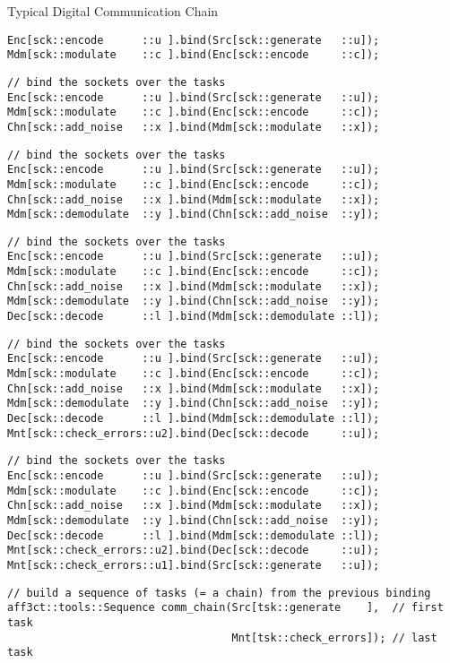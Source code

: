 \begin{frame}{Typical Digital Communication Chain}
\begin{overprint}
\begin{verbatim}
Enc[sck::encode      ::u ].bind(Src[sck::generate   ::u]);
Mdm[sck::modulate    ::c ].bind(Enc[sck::encode     ::c]);
  \end{verbatim}
  \begin{verbatim}
// bind the sockets over the tasks
Enc[sck::encode      ::u ].bind(Src[sck::generate   ::u]);
Mdm[sck::modulate    ::c ].bind(Enc[sck::encode     ::c]);
Chn[sck::add_noise   ::x ].bind(Mdm[sck::modulate   ::x]);
  \end{verbatim}
  \begin{verbatim}
// bind the sockets over the tasks
Enc[sck::encode      ::u ].bind(Src[sck::generate   ::u]);
Mdm[sck::modulate    ::c ].bind(Enc[sck::encode     ::c]);
Chn[sck::add_noise   ::x ].bind(Mdm[sck::modulate   ::x]);
Mdm[sck::demodulate  ::y ].bind(Chn[sck::add_noise  ::y]);
  \end{verbatim}
  \begin{verbatim}
// bind the sockets over the tasks
Enc[sck::encode      ::u ].bind(Src[sck::generate   ::u]);
Mdm[sck::modulate    ::c ].bind(Enc[sck::encode     ::c]);
Chn[sck::add_noise   ::x ].bind(Mdm[sck::modulate   ::x]);
Mdm[sck::demodulate  ::y ].bind(Chn[sck::add_noise  ::y]);
Dec[sck::decode      ::l ].bind(Mdm[sck::demodulate ::l]);
  \end{verbatim}
  \begin{verbatim}
// bind the sockets over the tasks
Enc[sck::encode      ::u ].bind(Src[sck::generate   ::u]);
Mdm[sck::modulate    ::c ].bind(Enc[sck::encode     ::c]);
Chn[sck::add_noise   ::x ].bind(Mdm[sck::modulate   ::x]);
Mdm[sck::demodulate  ::y ].bind(Chn[sck::add_noise  ::y]);
Dec[sck::decode      ::l ].bind(Mdm[sck::demodulate ::l]);
Mnt[sck::check_errors::u2].bind(Dec[sck::decode     ::u]);
  \end{verbatim}
  \begin{verbatim}
// bind the sockets over the tasks
Enc[sck::encode      ::u ].bind(Src[sck::generate   ::u]);
Mdm[sck::modulate    ::c ].bind(Enc[sck::encode     ::c]);
Chn[sck::add_noise   ::x ].bind(Mdm[sck::modulate   ::x]);
Mdm[sck::demodulate  ::y ].bind(Chn[sck::add_noise  ::y]);
Dec[sck::decode      ::l ].bind(Mdm[sck::demodulate ::l]);
Mnt[sck::check_errors::u2].bind(Dec[sck::decode     ::u]);
Mnt[sck::check_errors::u1].bind(Src[sck::generate   ::u]);
  \end{verbatim}
  \begin{verbatim}
// build a sequence of tasks (= a chain) from the previous binding
aff3ct::tools::Sequence comm_chain(Src[tsk::generate    ],  // first task
                                   Mnt[tsk::check_errors]); // last task


\end{verbatim}
\end{overprint}
\end{frame}

